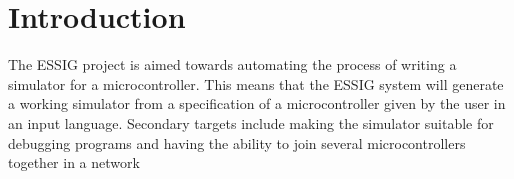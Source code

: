 \chapter{Introduction}
The \ac{ESSIG} project is aimed towards automating the process of
writing a simulator for a microcontroller. This means that the
\ac{ESSIG} system will generate a working simulator from a specification
of a microcontroller given by the user in an input language. Secondary
targets include making the simulator suitable for debugging programs and
having the ability to join several microcontrollers together in a
network

